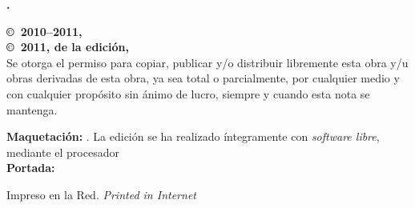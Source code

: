 \noindent
\textbf{\titlename. \subtitlename}\\
\authorname

\bigskip\bigskip\footnotesize\noindent
\textbf{\copyright\ 2010--2011, \authorname}\\
\textbf{\copyright\ 2011, de la edición, \editorname}\\
Se otorga el permiso para copiar, publicar y/o distribuir libremente esta obra y/u obras derivadas de esta obra, ya sea total o parcialmente, por cualquier medio y con cualquier propósito sin ánimo de lucro, siempre y cuando esta nota se mantenga.

\bigskip\noindent
\textbf{Maquetación:} \editorname. La edición se ha realizado íntegramente con \emph{software libre}, mediante el procesador \emph{\LaTeXe}\\
\textbf{Portada:} \coverauthorname

\bigskip\noindent
Impreso en la Red. \emph{Printed in Internet}
\normalsize

\endinput
